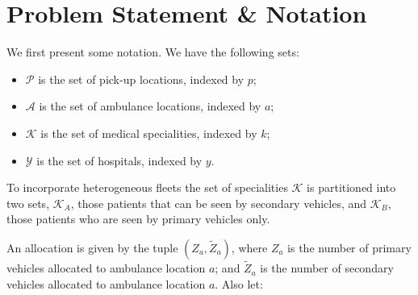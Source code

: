 \documentclass[preprint,12pt]{elsarticle}
\begin{document}
\section{Problem Statement \& Notation}\label{sec:problem_description}
We first present some notation. We have the following sets:

\begin{itemize}
  \item $\mathcal{P}$ is the set of pick-up locations, indexed by $p$;
  \item $\mathcal{A}$ is the set of ambulance locations, indexed by $a$;
  \item $\mathcal{K}$ is the set of medical specialities, indexed by $k$;
  \item $\mathcal{Y}$ is the set of hospitals, indexed by $y$.
\end{itemize}

To incorporate heterogeneous fleets the set of specialities $\mathcal{K}$ is
partitioned into two sets, $\mathcal{K}_A$, those patients that can be seen by
secondary vehicles, and $\mathcal{K}_B$, those patients who are seen by
primary vehicles only.

An allocation is given by the tuple $\left(Z_a, \tilde{Z}_a\right)$, where $Z_a$
is the number of primary vehicles allocated to ambulance location $a$; and
$\tilde{Z}_a$ is the number of secondary vehicles allocated to ambulance
location $a$. Also let:
\end{document}
